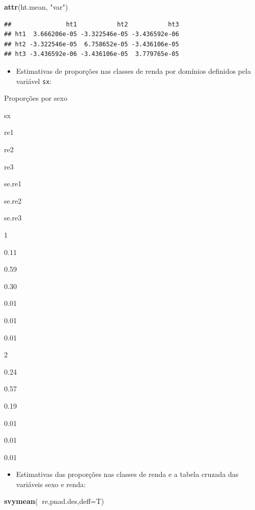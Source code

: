 \documentclass[]{book}
\newenvironment{Shaded}{\begin{snugshade}}{\end{snugshade}}
\newcommand{\KeywordTok}[1]{\textcolor[rgb]{0.13,0.29,0.53}{\textbf{#1}}}
\newcommand{\DataTypeTok}[1]{\textcolor[rgb]{0.13,0.29,0.53}{#1}}
\newcommand{\StringTok}[1]{\textcolor[rgb]{0.31,0.60,0.02}{#1}}
\newcommand{\OperatorTok}[1]{\textcolor[rgb]{0.81,0.36,0.00}{\textbf{#1}}}
\newcommand{\NormalTok}[1]{#1}
\providecommand{\tightlist}{%
  \setlength{\itemsep}{0pt}\setlength{\parskip}{0pt}}
\theoremstyle{definition}
\theoremstyle{definition}
\theoremstyle{definition}
\theoremstyle{remark}
\begin{document}
\begin{Shaded}
\begin{Highlighting}[]
\KeywordTok{attr}\NormalTok{(ht.mean, }\StringTok{"var"}\NormalTok{)}
\end{Highlighting}
\end{Shaded}

\begin{verbatim}
##               ht1           ht2           ht3
## ht1  3.666206e-05 -3.322546e-05 -3.436592e-06
## ht2 -3.322546e-05  6.758652e-05 -3.436106e-05
## ht3 -3.436592e-06 -3.436106e-05  3.779765e-05
\end{verbatim}

\begin{itemize}
\tightlist
\item
  Estimativas de proporções nas classes de renda por domínios definidos
  pela variável \texttt{sx}:
\end{itemize}

Proporções por sexo

sx

re1

re2

re3

se.re1

se.re2

se.re3

1

0.11

0.59

0.30

0.01

0.01

0.01

2

0.24

0.57

0.19

0.01

0.01

0.01

\begin{itemize}
\tightlist
\item
  Estimativas das proporções nas classes de renda e a tabela cruzada das
  variáveis sexo e renda:
\end{itemize}

\begin{Shaded}
\begin{Highlighting}[]
\KeywordTok{svymean}\NormalTok{(}\OperatorTok{~}\NormalTok{re,pnad.des,}\DataTypeTok{deff=}\NormalTok{T)}
\end{Highlighting}
\end{Shaded}
\end{document}
